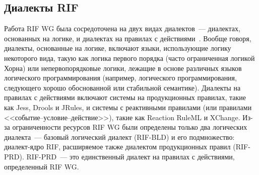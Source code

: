 \begin{multicols}{2}
\vspace*{-6pt}
   
   \subsection{Диалекты RIF} %

Работа RIF WG была сосредоточена на двух видах диалектов~--- диалектах, основанных на 
логике, и диалектах на правилах с действиями~\cite{7kal}. Вообще говоря, диалекты, 
основанные на логике, включают языки, использующие логику некоторого вида, такую как 
логика первого порядка (часто ограниченная логикой Хорна) или непервопорядковые 
логики, лежащие в основе различных языков логического программирования (например, 
логического программирования, следующего хорошо обоснованной или стабильной 
семантике). Диалекты на правилах с действиями включают системы на продукционных 
правилах, такие как Jess, Drools и JRules, и системы с реактивными правилами (или 
правилами <<со\-бы\-тие--усло\-вие--дейст\-вие>>), такие как Reaction RuleML и XChange. 
Из-за ограниченности ресурсов RIF WG были определены только два логических 
диалекта~--- базовый логический диалект (RIF-BLD) и его подмножество: диа\-лект-ядро RIF, 
расширяемое также диалектом продукционных правил (RIF-PRD). RIF-PRD~--- это 
единственный диалект на правилах с действиями, определенный RIF WG.


\end{multicols}
